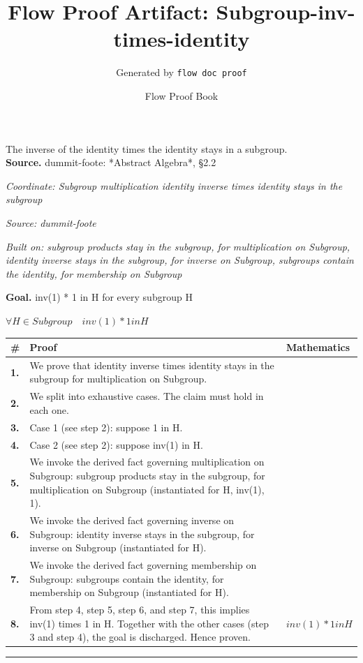 \documentclass[11pt]{article}
\title{Flow Proof Artifact: Subgroup-inv-times-identity}
\author{Generated by \texttt{flow doc proof}}
\date{Flow Proof Book}
\theoremstyle{definition}
\begin{document}
\maketitle
The inverse of the identity times the identity stays in a subgroup.\\[0.5em]
\textbf{Source.} dummit-foote: *Abstract Algebra*, §2.2\\[0.5em]
\bigskip
{}\par
\smallskip\noindent\textit{Coordinate: Subgroup \cdot multiplication \cdot identity inverse times identity stays in the subgroup}\par
\smallskip\noindent\textit{Source: dummit-foote}\par
\smallskip\noindent\textit{Built on: subgroup products stay in the subgroup, for multiplication on Subgroup, identity inverse stays in the subgroup, for inverse on Subgroup, subgroups contain the identity, for membership on Subgroup}\par
\medskip
\noindent\textbf{Goal.} inv(1) * 1 in H for every subgroup H\par
\noindent$\displaystyle \forall H \in Subgroup\quad inv(1) * 1 in H$\par
\medskip
\noindent
\begin{tabular}{@{} >{\raggedright\arraybackslash}p{} >{\raggedright\arraybackslash}p{} >{\raggedleft\arraybackslash}p{} @{}}
\textbf{\#} & \textbf{Proof} & \textbf{Mathematics} \\
\midrule
\textbf{1.} & We prove that identity inverse times identity stays in the subgroup for multiplication on Subgroup. & \\[0.45em]
\textbf{2.} & We split into exhaustive cases. The claim must hold in each one. & \\[0.45em]
\textbf{3.} & Case 1 (see step 2): suppose 1 in H. & \\[0.45em]
\textbf{4.} & Case 2 (see step 2): suppose inv(1) in H. & \\[0.45em]
\textbf{5.} & We invoke the derived fact governing multiplication on Subgroup: subgroup products stay in the subgroup, for multiplication on Subgroup (instantiated for H, inv(1), 1). & \\[0.45em]
\textbf{6.} & We invoke the derived fact governing inverse on Subgroup: identity inverse stays in the subgroup, for inverse on Subgroup (instantiated for H). & \\[0.45em]
\textbf{7.} & We invoke the derived fact governing membership on Subgroup: subgroups contain the identity, for membership on Subgroup (instantiated for H). & \\[0.45em]
\textbf{8.} & From step 4, step 5, step 6, and step 7, this implies inv(1) times 1 in H. Together with the other cases (step 3 and step 4), the goal is discharged. Hence proven. & $\displaystyle inv(1) * 1 in H$ \\[0.45em]
\bottomrule
\end{tabular}
\label{thm:Subgroup-multiplication-identity_inverse_times_identity_stays_in_the_subgroup}
\par\medskip\hrule
\end{document}
